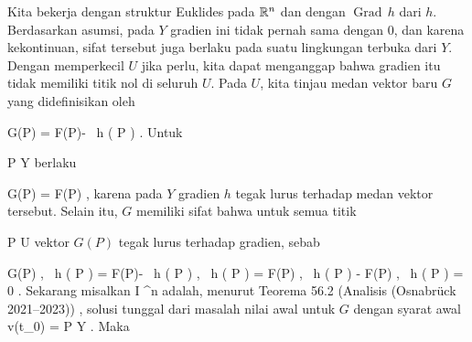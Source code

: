 {

Kita bekerja dengan struktur Euklides pada ${\mathbb R}^n$ dan dengan
$\operatorname{Grad} \,  h$ dari $h$. Berdasarkan asumsi, pada $Y$ gradien ini tidak pernah sama dengan $0$, dan karena kekontinuan, sifat tersebut juga berlaku pada suatu lingkungan terbuka dari $Y$. Dengan memperkecil $U$ jika perlu, kita dapat menganggap bahwa gradien itu tidak memiliki titik nol di seluruh $U$. Pada $U$, kita tinjau medan vektor baru $G$ yang didefinisikan oleh

\mavergleichskettedisp
{\vergleichskette
{ G(P)
}
{ =} { F(P)-  {  }
 \,  h  (  P )
}
{ } {
}
{ } {
}
{ } {
}
}
{}{}{.}
Untuk

\mavergleichskette
{\vergleichskette
{ P
}
{ \in }{ Y
}
{  }{
}
{    }{
}
{   }{
}
}
{}{}{}
berlaku

\mavergleichskette
{\vergleichskette
{ G(P)
}
{ = }{ F(P)
}
{  }{
}
{    }{
}
{   }{
}
}
{}{}{,}
karena pada $Y$ gradien $h$ tegak lurus terhadap medan vektor tersebut. Selain itu, $G$
 {} {}
memiliki sifat bahwa untuk semua titik

\mavergleichskette
{\vergleichskette
{ P
}
{ \in }{ U
}
{  }{
}
{    }{
}
{   }{
}
}
{}{}{}
vektor $G(P)$ tegak lurus terhadap gradien, sebab

\mavergleichskettealignhandlinks
{\vergleichskettealignhandlinks
{ \left\langle  G(P) ,
 \,  h  (  P )   \right\rangle
}
{ =} { \left\langle  F(P)- {  }
 \,  h  (  P )  ,
 \,  h  (  P )   \right\rangle
}
{ =} { \left\langle  F(P) ,
 \,  h  (  P )   \right\rangle - \left\langle  F(P) ,
 \,  h  (  P )   \right\rangle
}
{ =} { 0
}
{ } {
}
}
{}
{}{.}
Sekarang misalkan
 { I} { \R^n
} {}
adalah, menurut
Teorema 56.2 (Analisis (Osnabrück 2021--2023))
 {} {}
,
solusi tunggal dari masalah nilai awal untuk $G$ dengan syarat awal
\mavergleichskette
{\vergleichskette
{ v(t_0)
}
{ = }{ P
}
{ \in }{ Y
}
{    }{
}
{   }{
}
}
{}{}{.}
Maka

}
